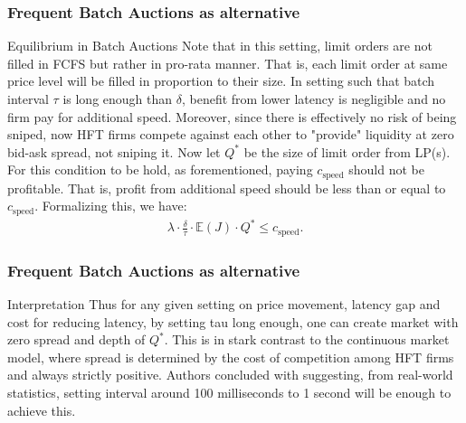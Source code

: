 \documentclass{beamer}
\begin{document}
\begin{frame}
    \frametitle{Frequent Batch Auctions as alternative}
    \begin{block}{Equilibrium in Batch Auctions}
        Note that in this setting, limit orders are not filled in FCFS but rather in pro-rata manner. That is, each limit order at same price level will be filled in proportion to their size. In setting such that batch interval $\tau$ is long enough than $\delta$, benefit from lower latency is negligible and no firm pay for additional speed. Moreover, since there is effectively no risk of being sniped, now HFT firms compete against each other to "provide" liquidity at zero bid-ask spread, not sniping it. Now let $Q^*$ be the size of limit order from LP(s). For this condition to be hold, as forementioned, paying $c_\text{speed}$ should not be profitable. That is, profit from additional speed should be less than or equal to $c_\text{speed}$. Formalizing this, we have: \begin{align}
            \lambda \cdot \frac{\delta}{\tau} \cdot \mathbb{E}(J) \cdot Q^* \leq c_\text{speed}.
        \end{align}
    \end{block}
\end{frame}

\begin{frame}
    \frametitle{Frequent Batch Auctions as alternative}
    \begin{block}{Interpretation}
        Thus for any given setting on price movement, latency gap and cost for reducing latency, by setting tau long enough, one can create market with zero spread and depth of $Q^*$. This is in stark contrast to the continuous market model, where spread is determined by the cost of competition among HFT firms and always strictly positive. Authors concluded with suggesting, from real-world statistics, setting interval around 100 milliseconds to 1 second will be enough to achieve this.
    \end{block}
\end{frame}
\end{document}
